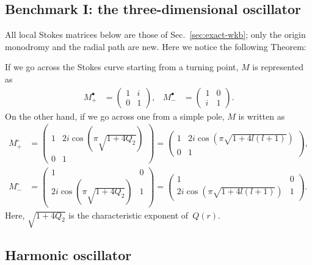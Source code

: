 \subsection{Benchmark I: the three-dimensional oscillator}
All local Stokes matrices below are those of
Sec.~\ref{sec:exact-wkb}; only the origin monodromy and the radial path are new.
Here we notice the following Theorem:
\begin{theorem}
If we go across the Stokes curve starting from a turning point, $M$ is represented as
\begin{align}
    M_{+}^\bullet &=
    \begin{pmatrix}
        1 & i \\ 0 & 1
    \end{pmatrix}, &
    M_{-}^\bullet &=
    \begin{pmatrix}
        1 & 0 \\ i & 1
    \end{pmatrix} .
\end{align}
On the other hand, if we go across one from a simple pole, $M$ is written as
\begin{align}
    M_{+}^\circ &=
    \begin{pmatrix}
        1 & 2i\cos(\pi\sqrt{1+4Q_2}) \\ 0 & 1
    \end{pmatrix}
    =
    \begin{pmatrix}
        1 & 2i\cos(\pi\sqrt{1+4l(l+1)}) \\ 0 & 1
    \end{pmatrix}, \\
    M_{-}^\circ &=
    \begin{pmatrix}
        1 & 0 \\ 2i\cos(\pi\sqrt{1+4Q_2}) & 1
    \end{pmatrix}
    =
    \begin{pmatrix}
        1 & 0 \\ 2i\cos(\pi\sqrt{1+4l(l+1)}) & 1
    \end{pmatrix}.
\end{align}
Here, $\sqrt{1+4Q_2}$ is the characteristic exponent of~$Q(r)$. 
\end{theorem}


\subsection{Harmonic oscillator}\label{src:2510_11766:sec:oscillator}
